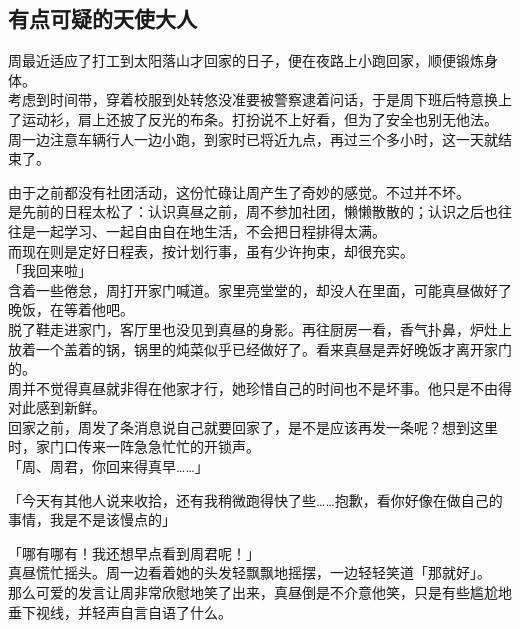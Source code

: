 \subsection{有点可疑的天使大人}

周最近适应了打工到太阳落山才回家的日子，便在夜路上小跑回家，顺便锻炼身体。\\

考虑到时间带，穿着校服到处转悠没准要被警察逮着问话，于是周下班后特意换上了运动衫，肩上还披了反光的布条。打扮说不上好看，但为了安全也别无他法。\\

周一边注意车辆行人一边小跑，到家时已将近九点，再过三个多小时，这一天就结束了。

由于之前都没有社团活动，这份忙碌让周产生了奇妙的感觉。不过并不坏。\\

是先前的日程太松了：认识真昼之前，周不参加社团，懒懒散散的；认识之后也往往是一起学习、一起自由自在地生活，不会把日程排得太满。\\

而现在则是定好日程表，按计划行事，虽有少许拘束，却很充实。\\

「我回来啦」\\

含着一些倦怠，周打开家门喊道。家里亮堂堂的，却没人在里面，可能真昼做好了晚饭，在等着他吧。\\

脱了鞋走进家门，客厅里也没见到真昼的身影。再往厨房一看，香气扑鼻，炉灶上放着一个盖着的锅，锅里的炖菜似乎已经做好了。看来真昼是弄好晚饭才离开家门的。\\

周并不觉得真昼就非得在他家才行，她珍惜自己的时间也不是坏事。他只是不由得对此感到新鲜。\\

回家之前，周发了条消息说自己就要回家了，是不是应该再发一条呢？想到这里时，家门口传来一阵急急忙忙的开锁声。\\

「周、周君，你回来得真早……」

「今天有其他人说来收拾，还有我稍微跑得快了些……抱歉，看你好像在做自己的事情，我是不是该慢点的」

「哪有哪有！我还想早点看到周君呢！」\\

真昼慌忙摇头。周一边看着她的头发轻飘飘地摇摆，一边轻轻笑道「那就好」。\\

那么可爱的发言让周非常欣慰地笑了出来，真昼倒是不介意他笑，只是有些尴尬地垂下视线，并轻声自言自语了什么。\\

